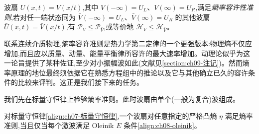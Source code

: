 \documentclass[../../main.tex]{subfiles}
\begin{document}
\begin{definition}[熵率容许性准则]\label{definition:ch09-熵率容许性准则}
波扇 $U(x,t)=V(x/t)$,其中 $V(-\infty)=U_{L}$、$V(\infty)=U_{R}$,满足\emph{熵率容许性准则},若对任一端状态同为 $\bar{V}(-\infty)=U_{L}$、$\bar{V}(\infty)=U_{R}$ 的其他波扇 $\bar{U}(x,t)=\bar{V}(x/t)$,有 $\mathscr{P}_{V}\leqslant\mathscr{P}_{\bar{V}}$,或等价地 $\dot{\mathscr{H}}_{V}\leqslant\dot{\mathscr{H}}_{\bar{V}}$。
\end{definition}

联系连续介质物理,熵率容许准则是热力学第二定律的一个更强版本:物理熵不仅应增加,而且应以质量、动量、能量平衡律所容许的最大速率增加。动理论似乎为这一论旨提供了某种佐证,至少对小振幅波如此(文献见\cref{section:ch09-注记})。然而熵率原理的地位最终须依据它在熟悉方程组中的推论以及它与其他确立已久的容许条件的比较来评判。这正是我们接下来的任务。

我们先在标量守恒律上检验熵率准则。此时波扇由单个(一般为复合)波组成。

\begin{theorem}\label{theorem:ch09-标量熵率}
对标量守恒律\eqref{align:ch07-标量守恒律},一个波扇对任意指定的严格凸熵 $\eta$ 满足熵率准则,当且仅当每个激波满足 Oleinik $E$ 条件\eqref{align:ch08-oleinik}。
\end{theorem}
\end{document}
